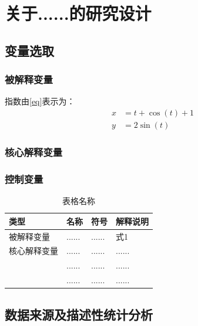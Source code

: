 \chapter{关于......的研究设计}
\section{变量选取}
\subsection{被解释变量}
指数由\ref{eq}表示为：
\begin{align}
 x &=t+\cos(t)  + 1 \label{eq:cos}  \\
    y &=2\sin(t)\label{eq}
\end{align}



\subsection{核心解释变量}

\subsection{控制变量}

\begin{table}[htbp]
\centering
\caption{表格名称}
\label{tab:}
\begin{tabular}{>{\centering\arraybackslash}m{2.5cm}>{\centering\arraybackslash}m{3cm}>{\centering\arraybackslash}m{3cm}>{\centering\arraybackslash}m{5.5cm}}
\toprule
\textbf{类型} & \textbf{名称} & \textbf{符号} & \textbf{解释说明} \\
\midrule
被解释变量 & ...... & ...... & 式1\\
核心解释变量 & ......& ...... & ......\\
\multirow{2}{*}{控制变量} 
& ...... & ...... & ......\\
& ...... & ...... & ......\\

\bottomrule
\end{tabular}
\end{table}


\section{数据来源及描述性统计分析}
